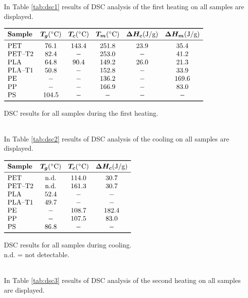 \documentclass[a4paper, 11pt]{article}
\begin{document}
In Table \ref{tab:dsc1} results of DSC analysis of the first heating on all samples are displayed. 
\begin{table}[htp]
\centering
$
\begin{array}{lccccc}
\toprule
\textbf{Sample} & \bm{T_{g}} (\SI{}{\celsius}) & \bm{T_{c}} (\SI{}{\celsius}) & \bm{T_m} (\SI{}{\celsius}) & \bm{\Delta H_{c}} (\si{J/g}) & \bm{\Delta H_m} (\si{J/g}) \\
\midrule
\text{PET} & 76.1 & 143.4 & 251.8 & 23.9 & 35.4 \\
\text{PET–T2} & 82.4 & - & 253.0 & - & 41.2 \\
\text{PLA} & 64.8 & 90.4 & 149.2 & 26.0 & 21.3  \\
\text{PLA–T1} & 50.8 & - & 152.8 & - & 33.9 \\
\text{PE} & - & - & 136.2 & - & 169.6  \\
\text{PP} & - & - & 166.9 & - & 83.0  \\
\text{PS} & 104.5 & - & - & - & -  \\
\bottomrule
\end{array}
$
\caption{DSC results for all samples during the first heating.}
\label{tab:dsc1}
\end{table}\\
In Table \ref{tab:dsc2} results of DSC analysis of the cooling on all samples are displayed. 
\begin{table}[htp]
\centering
$
\begin{array}{lccc}
\toprule
\textbf{Sample} & \bm{T_{g}} (\SI{}{\celsius}) & \bm{T_{c}} (\SI{}{\celsius}) & \bm{\Delta H_{c}} (\si{J/g}) \\
\midrule
\text{PET} & \text{n.d.} & 114.0 & 30.7  \\
\text{PET–T2} & \text{n.d.} & 161.3 & 30.7 \\
\text{PLA} & 52.4 & - & -  \\
\text{PLA–T1} & 49.7 & - & -  \\
\text{PE} & - & 108.7 & 182.4   \\
\text{PP} & - & 107.5 & 83.0   \\
\text{PS} & 86.8 & - & -  \\
\bottomrule
\end{array}
$
\caption{DSC results for all samples during cooling. \\n.d. = not detectable.}
\label{tab:dsc2}
\end{table}\\
In Table \ref{tab:dsc3} results of DSC analysis of the second heating on all samples are displayed. 
\end{document}

